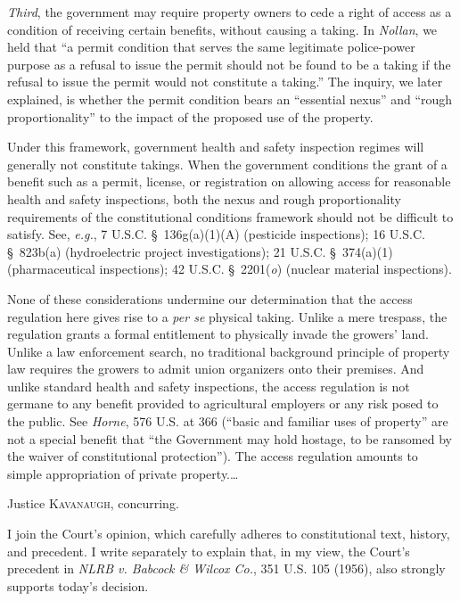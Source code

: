 \textit{Third}, the government may require property owners to cede a right of
access as a condition of receiving certain benefits, without causing a taking.
In \textit{Nollan}, we held that ``a permit condition that serves the same
legitimate police-power purpose as a refusal to issue the permit should not be
found to be a taking if the refusal to issue the permit would not constitute a
taking.'' The inquiry, we later explained, is whether the permit condition bears
an ``essential nexus'' and ``rough proportionality'' to the impact of the
proposed use of the property. 


Under this framework, government health and safety inspection regimes will
generally not constitute takings. When the government conditions the grant of a
benefit such as a permit, license, or registration on allowing access for
reasonable health and safety inspections, both the nexus and rough
proportionality requirements of the constitutional conditions framework should
not be difficult to satisfy. See, \textit{e.g.}, 7 U.S.C. \S~136g(a)(1)(A)
(pesticide inspections); 16 U.S.C. \S~823b(a) (hydroelectric project
investigations); 21 U.S.C. \S~374(a)(1) (pharmaceutical inspections); 42 U.S.C.
\S~2201(\textit{o}) (nuclear material inspections).


None of these considerations undermine our determination that the access
regulation here gives rise to a \textit{per se} physical taking. Unlike a mere
trespass, the regulation grants a formal entitlement to physically invade the
growers' land. Unlike a law enforcement search, no traditional background
principle of property law requires the growers to admit union organizers onto
their premises. And unlike standard health and safety inspections, the access
regulation is not germane to any benefit provided to agricultural employers or
any risk posed to the public. See \textit{Horne}, 576 U.S. at 366 (``basic and
familiar uses of property'' are not a special benefit that ``the Government may
hold hostage, to be ransomed by the waiver of constitutional protection''). The
access regulation amounts to simple appropriation of private property.\ldots

\opinion Justice \textsc{Kavanaugh}, concurring.

I join the Court's opinion, which carefully adheres to constitutional text,
history, and precedent. I write separately to explain that, in my view, the
Court's precedent in \textit{NLRB v. Babcock \& Wilcox Co.}, 351 U.S. 105
(1956), also strongly supports today's decision.


